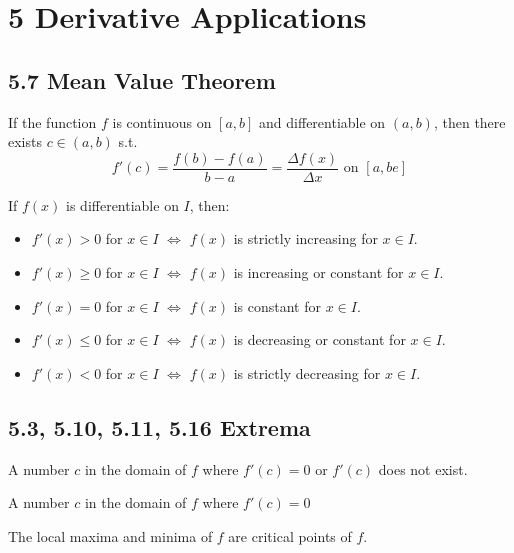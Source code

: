 \section*{5 Derivative Applications}

\subsection*{5.7 Mean Value Theorem}

\begin{theorem}
  If the function $f$ is continuous on $[a, b]$ and differentiable on $(a, b)$, then there exists $c \in (a, b)$ s.t.
  \[
    f'(c) = \frac{f(b) - f(a)}{b - a} = \frac{\Delta f(x)}{\Delta x} \text{ on } [a, be]
  \]
\end{theorem}

\begin{theorem}
  If $f(x)$ is differentiable on $I$, then:
  \begin{itemize}
    \item $f'(x) > 0$ for $x \in I$ $\iff$ $f(x)$ is strictly increasing for $x \in I$.
    \item $f'(x) \geq 0$ for $x \in I$ $\iff$ $f(x)$ is increasing or constant for $x \in I$.
    \item $f'(x) = 0$ for $x \in I$ $\iff$ $f(x)$ is constant for $x \in I$.
    \item $f'(x) \leq 0$ for $x \in I$ $\iff$ $f(x)$ is decreasing or constant for $x \in I$.
    \item $f'(x) < 0$ for $x \in I$ $\iff$ $f(x)$ is strictly decreasing for $x \in I$.
  \end{itemize}
\end{theorem}

\subsection*{5.3, 5.10, 5.11, 5.16 Extrema}

\begin{definition}
  A number $c$ in the domain of $f$ where $f'(c) = 0$ or $f'(c)$ does not exist.
\end{definition}

\begin{definition}
  A number $c$ in the domain of $f$ where $f'(c) = 0$
\end{definition}

\begin{namedtheorem}
  The local maxima and minima of $f$ are critical points of $f$.
\end{namedtheorem}

